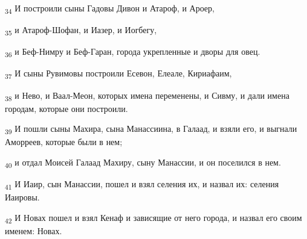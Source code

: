 \begin{tcolorbox}
\textsubscript{34} И построили сыны Гадовы Дивон и Атароф, и Ароер,
\end{tcolorbox}
\begin{tcolorbox}
\textsubscript{35} и Атароф-Шофан, и Иазер, и Иогбегу,
\end{tcolorbox}
\begin{tcolorbox}
\textsubscript{36} и Беф-Нимру и Беф-Гаран, города укрепленные и дворы для овец.
\end{tcolorbox}
\begin{tcolorbox}
\textsubscript{37} И сыны Рувимовы построили Есевон, Елеале, Кириафаим,
\end{tcolorbox}
\begin{tcolorbox}
\textsubscript{38} и Нево, и Ваал-Меон, которых имена переменены, и Сивму, и дали имена городам, которые они построили.
\end{tcolorbox}
\begin{tcolorbox}
\textsubscript{39} И пошли сыны Махира, сына Манассиина, в Галаад, и взяли его, и выгнали Аморреев, которые были в нем;
\end{tcolorbox}
\begin{tcolorbox}
\textsubscript{40} и отдал Моисей Галаад Махиру, сыну Манассии, и он поселился в нем.
\end{tcolorbox}
\begin{tcolorbox}
\textsubscript{41} И Иаир, сын Манассии, пошел и взял селения их, и назвал их: селения Иаировы.
\end{tcolorbox}
\begin{tcolorbox}
\textsubscript{42} И Новах пошел и взял Кенаф и зависящие от него города, и назвал его своим именем: Новах.
\end{tcolorbox}
